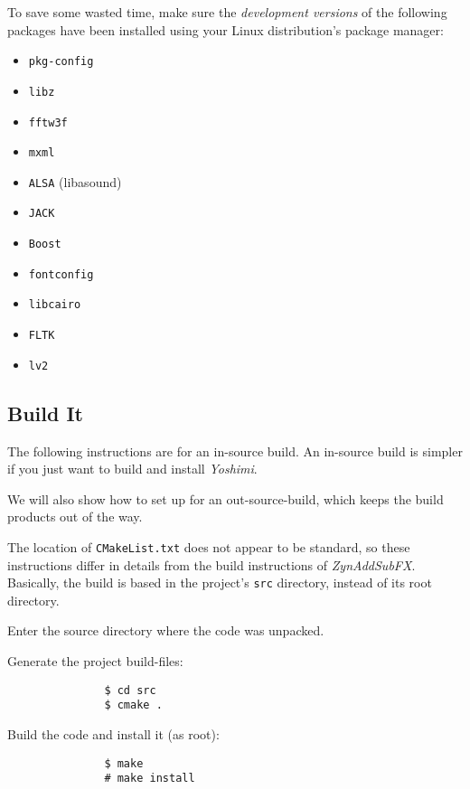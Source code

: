   To save some wasted time, make sure the \textsl{development versions}
   of the following packages have been installed using your Linux
   distribution's package manager:

   \begin{itemize}
      \item \texttt{pkg-config}
      \item \texttt{libz}
      \item \texttt{fftw3f}
      \item \texttt{mxml}
      \item \texttt{ALSA} (libasound)
      \item \texttt{JACK}
      \item \texttt{Boost}
      \item \texttt{fontconfig}
      \item \texttt{libcairo}
      \item \texttt{FLTK}
      \item \texttt{lv2}
   \end{itemize}

\subsection{Build It}
\label{sec:yoshimi_build_it}

   The following instructions are for an in-source build.  An in-source
   build is simpler if you just want to build and install \textsl{Yoshimi}.

   We will also show how to set up for an out-source-build, which keeps
   the build products out of the way.

   The location of \texttt{CMakeList.txt} does not appear to be standard, so
   these instructions differ in details from the build instructions of
   \textsl{ZynAddSubFX}.  Basically, the build is based in the project's
   \texttt{src} directory, instead of its root directory.

   \begin{enumber}
      \item Enter the source directory where the code was unpacked.
      \item Generate the project build-files:
            \begin{verbatim}
               $ cd src
               $ cmake .
            \end{verbatim}
      \item Build the code and install it (as root):
            \begin{verbatim}
               $ make
               # make install
            \end{verbatim}
   \end{enumber}

